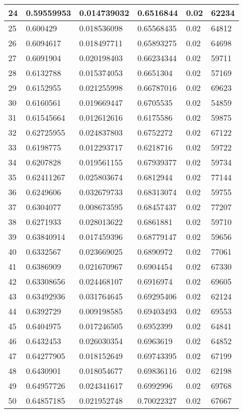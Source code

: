 \begin{longtable}{|l|l|l|l|l|l|}
24 & 0.59559953 & 0.014739032 & 0.6516844 & 0.02 & 62234 \\ \hline 
25 & 0.600429 & 0.018536098 & 0.65568435 & 0.02 & 64812 \\ \hline 
26 & 0.6094617 & 0.018497711 & 0.65893275 & 0.02 & 64698 \\ \hline 
27 & 0.6091904 & 0.020198403 & 0.66234344 & 0.02 & 59711 \\ \hline 
28 & 0.6132788 & 0.015374053 & 0.6651304 & 0.02 & 57169 \\ \hline 
29 & 0.6152955 & 0.021255998 & 0.66787016 & 0.02 & 69623 \\ \hline 
30 & 0.6160561 & 0.019669447 & 0.6705535 & 0.02 & 54859 \\ \hline 
31 & 0.61545664 & 0.012612616 & 0.6175586 & 0.02 & 59875 \\ \hline 
32 & 0.62725955 & 0.024837803 & 0.6752272 & 0.02 & 67122 \\ \hline 
33 & 0.6198775 & 0.012293717 & 0.6218716 & 0.02 & 59722 \\ \hline 
34 & 0.6207828 & 0.019561155 & 0.67939377 & 0.02 & 59734 \\ \hline 
35 & 0.62411267 & 0.025803674 & 0.6812944 & 0.02 & 77144 \\ \hline 
36 & 0.6249606 & 0.032679733 & 0.68313074 & 0.02 & 59755 \\ \hline 
37 & 0.6304077 & 0.008673595 & 0.68457437 & 0.02 & 77207 \\ \hline 
38 & 0.6271933 & 0.028013622 & 0.6861881 & 0.02 & 59710 \\ \hline 
39 & 0.63840914 & 0.017459396 & 0.68779147 & 0.02 & 59656 \\ \hline 
40 & 0.6332567 & 0.023669025 & 0.6890972 & 0.02 & 77061 \\ \hline 
41 & 0.6386909 & 0.021670967 & 0.6904454 & 0.02 & 67330 \\ \hline 
42 & 0.63308656 & 0.024468107 & 0.6916974 & 0.02 & 69605 \\ \hline 
43 & 0.63492936 & 0.031764645 & 0.69295406 & 0.02 & 62124 \\ \hline 
44 & 0.6392729 & 0.009198585 & 0.69403493 & 0.02 & 69553 \\ \hline 
45 & 0.6404975 & 0.017246505 & 0.6952399 & 0.02 & 64841 \\ \hline 
46 & 0.6432453 & 0.026030354 & 0.6963619 & 0.02 & 64852 \\ \hline 
47 & 0.64277905 & 0.018152649 & 0.69743395 & 0.02 & 67199 \\ \hline 
48 & 0.6430901 & 0.018054677 & 0.69836116 & 0.02 & 62198 \\ \hline 
49 & 0.64957726 & 0.024341617 & 0.6992996 & 0.02 & 69768 \\ \hline 
50 & 0.64857185 & 0.021952748 & 0.70022327 & 0.02 & 67667 \\ \hline 
\end{longtable}